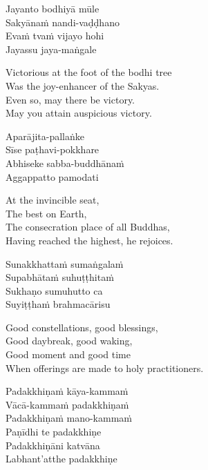 \begin{pali-hang-continued}
  Jayanto bodhiyā mūle\\
  Sakyānaṁ nandi-vaḍḍhano\\
  Evaṁ tvaṁ vijayo hohi\\
  Jayassu jaya-maṅgale
\end{pali-hang-continued}

\begin{english-verses}
  Victorious at the foot of the bodhi tree\\
  Was the joy-enhancer of the Sakyas.\\
  Even so, may there be victory.\\
  May you attain auspicious victory.
\end{english-verses}

\begin{pali-hang-continued}
  Aparājita-pallaṅke\\
  Sīse paṭhavi-pokkhare\\
  Abhiseke sabba-buddhānaṁ\\
  Aggappatto pamodati
\end{pali-hang-continued}

\begin{english-verses}
  At the invincible seat,\\
  The best on Earth,\\
  The consecration place of all Buddhas,\\
  Having reached the highest, he rejoices.
\end{english-verses}

\suttaRef{[MJG]}

\begin{pali-hang-continued}
  Sunakkhattaṁ sumaṅgalaṁ\\
  Supabhātaṁ suhuṭṭhitaṁ\\
  Sukhaṇo sumuhutto ca\\
  Suyiṭṭhaṁ brahmacārisu
\end{pali-hang-continued}

\begin{english-verses}
  Good constellations, good blessings,\\
  Good daybreak, good waking,\\
  Good moment and good time\\
  When offerings are made to holy practitioners.
\end{english-verses}

\begin{pali-hang-continued}
  Padakkhiṇaṁ kāya-kammaṁ\\
  Vācā-kammaṁ padakkhiṇaṁ\\
  Padakkhiṇaṁ mano-kammaṁ\\
  Paṇīdhi te padakkhiṇe\makeatletter\hyperlink{endnote130-appendix}\makeatother\\
  Padakkhiṇāni katvāna\\
  Labhant'atthe padakkhiṇe
\end{pali-hang-continued}

